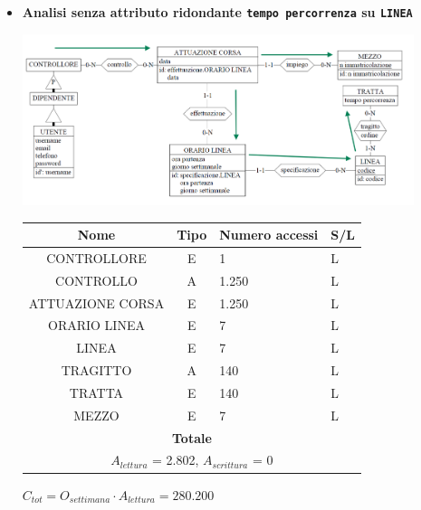 \documentclass[12pt,a4paper]{report}
\begin{document}
\begin{enumerate}[label=\textbf{\arabic*)}]
\begin{itemize}
    \item \textbf{Analisi senza attributo ridondante \texttt{tempo percorrenza} su \texttt{LINEA}}
    \begin{center}
    \includegraphics[width=0.9\textwidth]{VisualOrarioControlloriNoRid}
    \end{center}
    \begin{table}[H]
    \centering
    \begin{tabular}{|c|c|l|l|}
    \hline
    \textbf{Nome} & \textbf{Tipo} & \textbf{Numero accessi} & \textbf{S/L} \\
    \hline
    CONTROLLORE & E & 1 & L \\
    \hline
    CONTROLLO & A & 1.250 & L \\
    \hline
    ATTUAZIONE CORSA & E & 1.250 & L \\
    \hline
    ORARIO LINEA & E & 7 & L \\
    \hline
    LINEA & E & 7 & L \\
    \hline
    TRAGITTO & A & 140 & L \\
    \hline
    TRATTA & E & 140 & L \\
    \hline
    MEZZO & E & 7 & L \\
   \hline
    \multicolumn{4}{c}{\textbf{Totale}} \\
    \multicolumn{4}{c}{${A_{lettura}}$ = 2.802, ${A_{scrittura}}$ = 0} \\
    \hline
    \end{tabular}
    \end{table}
    \begin{center}
    ${C_{tot} = {O_{settimana}}\cdot{A_{lettura}}= 280.200}$
    \end{center}
    \end{itemize}



\end{enumerate}
\end{document}
